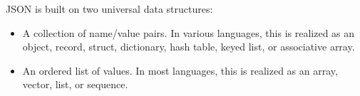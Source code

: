 \documentclass{report}
\begin{document}
JSON is built on two universal data structures:
\begin{itemize}
\item A collection of name/value pairs. In various languages, this is realized as an object, record, struct, dictionary, hash table, keyed list, or associative array.
\item An ordered list of values. In most languages, this is realized as an array, vector, list, or sequence.
\end{itemize}

\end{document}
